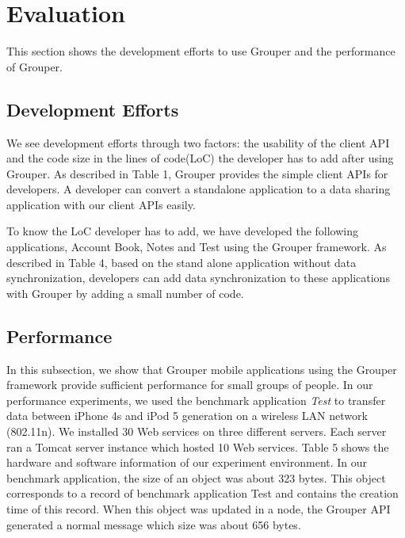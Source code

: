 \documentclass[twocolumn,10pt]{article}
\begin{document}
\section{Evaluation}

This section shows the development efforts to use Grouper and the performance of Grouper.

\subsection{Development Efforts}

We see development efforts through two factors: the usability of the client API and the code size in the lines of code(LoC) the developer has to add after using Grouper. 
As described in Table 1, Grouper provides the simple client APIs for developers.
A developer can convert a standalone application to a data sharing application with our client APIs easily.

To know the LoC developer has to add, we have developed the following applications, Account Book, Notes and Test using the Grouper framework.
As described in Table 4, based on the stand alone application without data synchronization, developers can add data synchronization to these applications with Grouper by adding a small number of code. 

\subsection{Performance}

In this subsection, we show that Grouper mobile applications using the Grouper framework provide sufficient performance for small groups of people.
In our performance experiments, we used the benchmark application \emph{Test} to transfer data between iPhone 4s and iPod 5 generation on a wireless LAN network (802.11n).
We installed 30 Web services on three different servers.
Each server ran a Tomcat server instance which hosted 10 Web services.
Table 5 shows the hardware and software information of our experiment environment.
In our benchmark application, the size of an object was about 323 bytes.
This object corresponds to a record of benchmark application Test and contains the creation time of this record.
When this object was updated in a node, the Grouper API generated a normal message which size was about 656 bytes.
\end{document}
